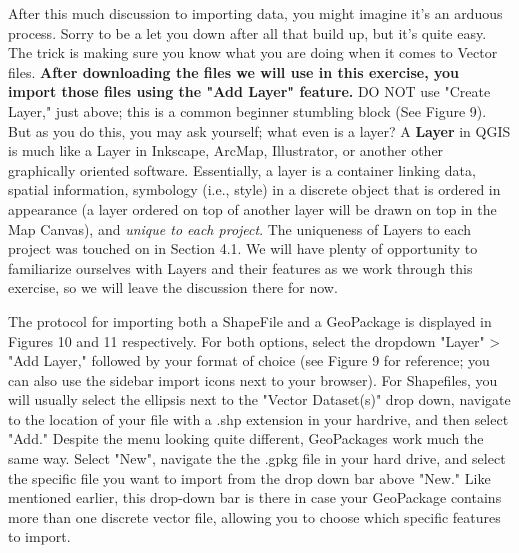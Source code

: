\documentclass{article}
\begin{document}
After this much discussion to importing data, you might imagine it's an arduous process. Sorry to be a let you down after all that build up, but it's quite easy. The trick is making sure you know what you are doing when it comes to Vector files. \textbf{After downloading the files we will use in this exercise, you import those files using the "Add Layer" feature.} DO NOT use "Create Layer," just above; this is a common beginner stumbling block (See Figure 9). But as you do this, you may ask yourself; what even is a layer? A \textbf{Layer} in QGIS is much like a Layer in Inkscape, ArcMap, Illustrator, or another other graphically oriented software. Essentially, a layer is a container linking data, spatial information, symbology (i.e., style) in a discrete object that is ordered in appearance (a layer ordered on top of another layer will be drawn on top in the Map Canvas), and \textit{unique to each project}. The uniqueness of Layers to each project was touched on in Section 4.1. We will have plenty of opportunity to familiarize ourselves with Layers and their features as we work through this exercise, so we will leave the discussion there for now. 

The protocol for importing both a ShapeFile and a GeoPackage is displayed in Figures 10 and 11 respectively. For both options, select the dropdown "Layer" > "Add Layer," followed by your format of choice (see Figure 9 for reference; you can also use the sidebar import icons next to your browser). For Shapefiles, you will usually select the ellipsis next to the "Vector Dataset(s)" drop down, navigate to the location of your file with a .shp extension in your hardrive, and then select "Add." Despite the menu looking quite different, GeoPackages work much the same way. Select "New", navigate the the .gpkg file in your hard drive, and select the specific file you want to import from the drop down bar above "New." Like mentioned earlier, this drop-down bar is there in case your GeoPackage contains more than one discrete vector file, allowing you to choose which specific features to import. 
\end{document}
